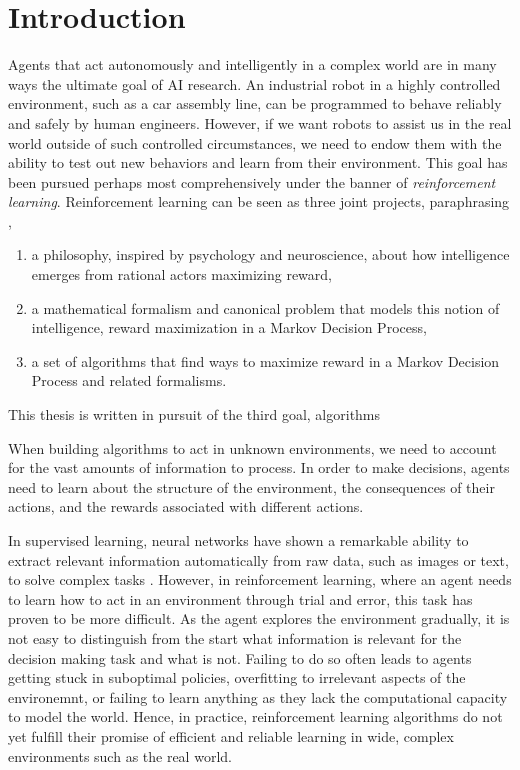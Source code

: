 \chapter{Introduction}

Agents that act autonomously and intelligently in a complex world are in many ways the ultimate goal of AI research.
An industrial robot in a highly controlled environment, such as a car assembly line, can be programmed to behave reliably and safely by human engineers.
However, if we want robots to assist us in the real world outside of such controlled circumstances, we need to endow them with the ability to test out new behaviors and learn from their environment.
This goal has been pursued perhaps most comprehensively under the banner of \emph{reinforcement learning}.
Reinforcement learning can be seen as three joint projects, paraphrasing \textcite{suttonbook},
\begin{enumerate}
	\item a philosophy, inspired by psychology and neuroscience, about how intelligence emerges from rational actors maximizing reward,
	\item a mathematical formalism and canonical problem that models this notion of intelligence, reward maximization in a Markov Decision Process,
	\item a set of algorithms that find ways to maximize reward in a Markov Decision Process and related formalisms.
\end{enumerate}
This thesis is written in pursuit of the third goal, algorithms

When building algorithms to act in unknown environments, we need to account for the vast amounts of information to process.
In order to make decisions, agents need to learn about the structure of the environment, the consequences of their actions, and the rewards associated with different actions.

In supervised learning, neural networks have shown a remarkable ability to extract relevant information automatically from raw data, such as images or text, to solve complex tasks \parencite{lecun2015deep}.
However, in reinforcement learning, where an agent needs to learn how to act in an environment through trial and error, this task has proven to be more difficult.
As the agent explores the environment gradually, it is not easy to distinguish from the start what information is relevant for the decision making task and what is not.
Failing to do so often leads to agents getting stuck in suboptimal policies, overfitting to irrelevant aspects of the environemnt, or failing to learn anything as they lack the computational capacity to model the world.
Hence, in practice, reinforcement learning algorithms do not yet fulfill their promise of efficient and reliable learning in wide, complex environments such as the real world.


